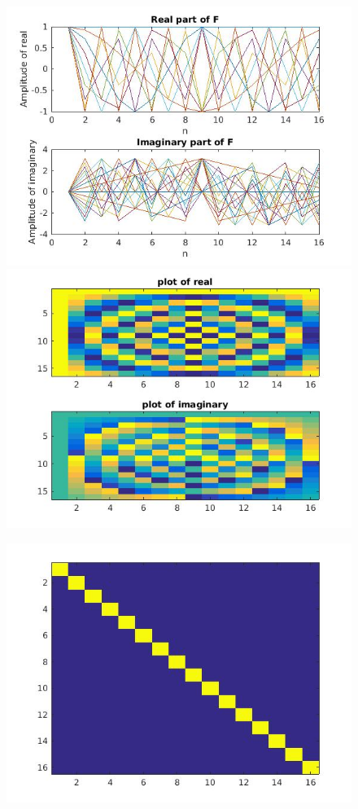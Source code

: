 \documentclass{article}
\begin{document}
\begin{figure}[H]

\includegraphics[scale =.4]{report4_1}
\includegraphics[scale =.4]{report4_2}
\end{figure}

\begin{figure}[H]

\includegraphics[scale =.5]{report5_1}
\end{figure}
\end{document}
